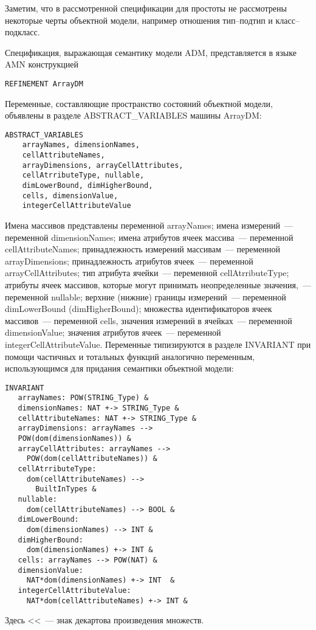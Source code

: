 \begin{multicols}{2}
        Заметим, что в рассмотренной спецификации для простоты не 
рассмотрены некоторые черты объектной модели, например отношения 
        тип--под\-тип и класс--под\-класс.
        
        \smallskip
        
        Спецификация, выражающая семантику модели ADM, представляется в 
языке AMN конструкцией
        \begin{verbatim}
REFINEMENT ArrayDM
\end{verbatim}

        Переменные, составляющие пространство состояний объектной модели, 
объявлены в разделе {\sf ABSTRACT\_VARIABLES} машины {\sf ArrayDM}:
        \begin{verbatim}
ABSTRACT_VARIABLES
    arrayNames, dimensionNames, 
    cellAttributeNames,
    arrayDimensions, arrayCellAttributes,    
    cellAtrributeType, nullable, 
    dimLowerBound, dimHigherBound,
    cells, dimensionValue, 
    integerCellAttributeValue
\end{verbatim}

        Имена массивов представлены переменной\linebreak 
{\sf arrayNames}; имена измерений~--- переменной\linebreak 
{\sf  dimensionNames}; имена атрибутов ячеек массива~--- переменной 
\mbox{{\sf cellAttributeNames}}; принадлежность измерений массивам~--- переменной 
\mbox{{\sf arrayDimensions}}; принадлежность атрибутов ячеек~--- переменной 
\mbox{{\sf arrayCellAttributes}}; 
тип атрибута ячейки~--- переменной \mbox{{\sf cellAtrributeType}}; 
атрибуты ячеек массивов, которые могут принимать неопределенные 
значения,~--- переменной \mbox{{\sf nullable}}; верхние (нижние) границы измерений~--- 
переменной \mbox{{\sf dimLowerBound}} (\mbox{{\sf dimHigherBound}}); множества 
идентификаторов ячеек массивов~--- переменной 
\mbox{{\sf cells}}, значения измерений в 
ячейках~--- переменной \mbox{{\sf dimensionValue}}; значения атрибутов ячеек~--- 
переменной \mbox{{\sf integerCellAttributeValue}}. Переменные типизируются в разделе 
\mbox{{\sf INVARIANT}} при помощи частичных и тотальных функций аналогично 
переменным, использующимся для придания семантики объектной модели:
        \begin{verbatim}
INVARIANT
   arrayNames: POW(STRING_Type) &
   dimensionNames: NAT +-> STRING_Type &
   cellAttributeNames: NAT +-> STRING_Type &
   arrayDimensions: arrayNames --> 
   POW(dom(dimensionNames)) &
   arrayCellAttributes: arrayNames --> 
     POW(dom(cellAttributeNames)) &
   cellAtrributeType: 
     dom(cellAttributeNames) --> 
       BuiltInTypes &
   nullable: 
     dom(cellAttributeNames) --> BOOL &
   dimLowerBound: 
     dom(dimensionNames) --> INT &
   dimHigherBound: 
     dom(dimensionNames) +-> INT &
   cells: arrayNames --> POW(NAT) & 
   dimensionValue: 
     NAT*dom(dimensionNames) +-> INT  &
   integerCellAttributeValue: 
     NAT*dom(cellAttributeNames) +-> INT &
\end{verbatim}
        Здесь <<\verb * >>~--- знак декартова произведения множеств.
        

\end{multicols}
